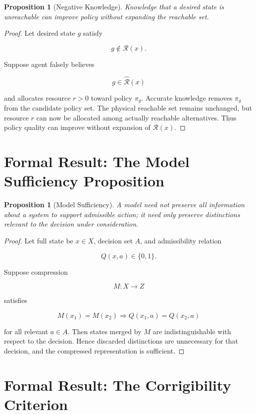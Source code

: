 \documentclass[11pt,oneside]{book}
\newtheorem{proposition}[theorem]{Proposition}
\theoremstyle{definition}
\theoremstyle{remark}
\newcommand{\R}{\mathcal{R}}
\begin{document}
\begin{proposition}[Negative Knowledge]
Knowledge that a desired state is unreachable can improve policy without expanding the reachable set.
\end{proposition}

\begin{proof}
Let desired state \(g\) satisfy

\[
g\notin\R(x).
\]

Suppose agent falsely believes

\[
g\in\widehat{\R}(x)
\]

and allocates resource \(r>0\) toward policy \(\pi_g\). Accurate knowledge removes \(\pi_g\) from the candidate policy set. The physical reachable set remains unchanged, but resource \(r\) can now be allocated among actually reachable alternatives. Thus policy quality can improve without expansion of \(\R(x)\).
\end{proof}

\section{Formal Result: The Model Sufficiency Proposition}

\begin{proposition}[Model Sufficiency]
A model need not preserve all information about a system to support admissible action; it need only preserve distinctions relevant to the decision under consideration.
\end{proposition}

\begin{proof}
Let full state be \(x\in X\), decision set \(A\), and admissibility relation

\[
Q(x,a)\in\{0,1\}.
\]

Suppose compression

\[
M:X\rightarrow Z
\]

satisfies

\[
M(x_1)=M(x_2)
\Rightarrow
Q(x_1,a)=Q(x_2,a)
\]

for all relevant \(a\in A\). Then states merged by \(M\) are indistinguishable with respect to the decision. Hence discarded distinctions are unnecessary for that decision, and the compressed representation is sufficient.
\end{proof}

\section{Formal Result: The Corrigibility Criterion}
\end{document}
